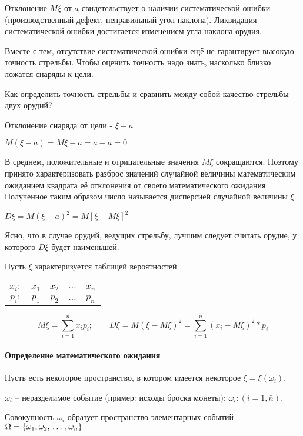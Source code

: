 ﻿\documentclass[a4paper,12pt]{report}
\begin{document}
	Отклонение $M\xi$ от $a$ свидетельствует о наличии систематической ошибки (производственный дефект, неправильный угол наклона). Ликвидация систематической ошибки достигается изменением угла наклона орудия. 

	Вместе с тем, отсутствие систематической ошибки ещё не гарантирует высокую точность стрельбы. Чтобы оценить точность надо знать, насколько близко ложатся снаряды к цели. 

	Как определить точность стрельбы и сравнить между собой качество стрельбы двух орудий?

	Отклонение снаряда от цели - $\xi - a$
	
	$M(\xi - a) = M\xi - a = a - a = 0$

	В среднем, положительные и отрицательные значения $M\xi$ сокращаются. Поэтому принято характеризовать разброс значений случайной величины математическим ожиданием квадрата её отклонения от своего математического ожидания. Полученное таким образом число называется дисперсией случайной величины $\xi$. 

	$D\xi = M(\xi-a)^2 = M[\xi-M\xi]^2$

	Ясно, что в случае орудий, ведущих стрельбу, лучшим следует считать орудие, у которого $D\xi$ будет наименьшей.

	Пусть $\xi$ характеризуется таблицей вероятностей \strut


	\begin{tabular}{|r|c|c|c|c|}
	\hline
		$x_i:$ & $x_1$ & $x_2$ & $\ldots$ & $x_n$\\
	\hline	
		$p_i:$ & $p_1$ & $p_2$ & $\ldots$ & $p_n$\\
	\hline
	\end{tabular}

	
	$$
	  M\xi = \sum^n_{i=1}x_ip_i;
	  \qquad
	  D\xi = M (\xi - M\xi)^2 
	       = \sum^n_{i=1}(x_i-M\xi)^2*p_i
	$$



	\paragraph{Определение математического ожидания}

	Пусть есть некоторое пространство, в котором имеется некоторое $\xi = \xi(\omega_i)$.

	$\omega_i$ – неразделимое событие (пример: исходы броска монеты); $\omega_i:(i=1,\bar n)$.

	Совокупность $\omega_i$ образует пространство элементарных событий
	$\Omega = \{ \omega_1, \omega_2, \,\ldots\,, \omega_n \}$
\end{document}
